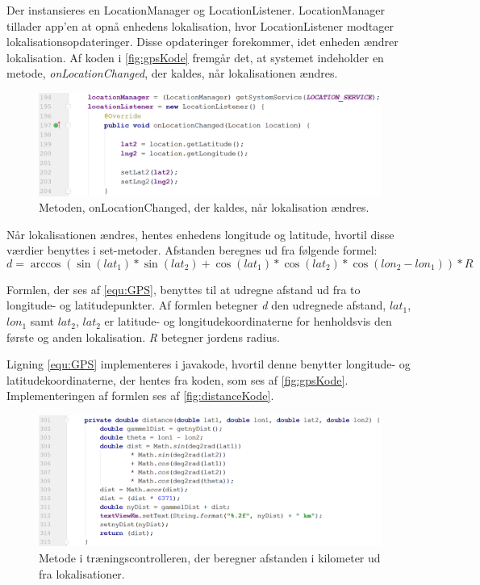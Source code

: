 Der instansieres en LocationManager og LocationListener. LocationManager tillader app'en at opnå enhedens lokalisation, hvor LocationListener modtager lokalisationsopdateringer. Disse opdateringer forekommer, idet enheden ændrer lokalisation.\cite{LocationManager, LocationListener} Af koden i \autoref{fig:gpsKode} fremgår det, at systemet indeholder en metode, \textit{onLocationChanged}, der kaldes, når lokalisationen ændres. 

\begin{figure} [H]
\centering
\includegraphics[width=1\textwidth]{figures/imple/gpsKode}
\caption{Metoden, onLocationChanged, der kaldes, når lokalisation ændres.}
\label{fig:gpsKode}
\end{figure} 

\noindent
Når lokalisationen ændres, hentes enhedens longitude og latitude, hvortil disse værdier benyttes i set-metoder. Afstanden beregnes ud fra følgende formel:
\begin{equation} \label{equ:GPS}
d = \arccos(\sin(lat_1)*\sin(lat_2)+\cos(lat_1)*\cos(lat_2)*\cos(lon_2-lon_1))*R
\end{equation}

\noindent
Formlen, der ses af \autoref{equ:GPS}, benyttes til at udregne afstand ud fra to longitude- og latitudepunkter. Af formlen betegner \textit{d} den udregnede afstand, \textit{$lat_1$}, \textit{$lon_1$} samt \textit{$lat_2$}, \textit{$lat_2$} er latitude- og longitudekoordinaterne for henholdsvis den første og anden lokalisation. \textit{R} betegner jordens radius.\cite{Deza2009}    

Ligning \ref{equ:GPS} implementeres i javakode, hvortil denne benytter longitude- og latitudekoordinaterne, der hentes fra koden, som ses af \autoref{fig:gpsKode}. Implementeringen af formlen ses af \autoref{fig:distanceKode}.

\begin{figure} [H]
\centering
\includegraphics[width=1\textwidth]{figures/imple/distanceKode}
\caption{Metode i træningscontrolleren, der beregner afstanden i kilometer ud fra lokalisationer.}
\label{fig:distanceKode}
\end{figure}
 
